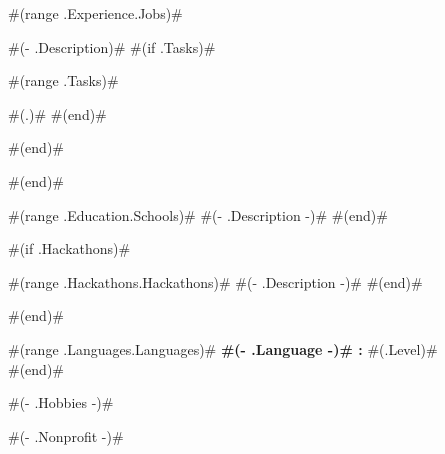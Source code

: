 \documentclass[8pt]{developercv} %
\begin{document}

\begin{entrylist}
	#(range .Experience.Jobs)#
	{ #(- .Description)# 
	#(if .Tasks)#\begin{compactitem}
		#(range .Tasks)# \item #(.)#
		#(end)#\end{compactitem}
	#(end)# }
#(end)#
\end{entrylist}


\begin{entrylist}
	#(range .Education.Schools)#
	{ #(- .Description -)# }
#(end)#
\end{entrylist}


#(if .Hackathons)#
\begin{entrylist}
	#(range .Hackathons.Hackathons)#
	{ #(- .Description -)# }
	#(end)#
\end{entrylist}
#(end)#



\begin{minipage}[t]{0.3\textwidth}
	\vspace{-\baselineskip} %

	#(range .Languages.Languages)#\textbf{ #(- .Language -)# :} #(.Level)# \\
	#(end)#
\end{minipage}
\hfill
\begin{minipage}[t]{0.3\textwidth}
	\vspace{-\baselineskip} %
	
	#(- .Hobbies -)#
\end{minipage}
\hfill
\begin{minipage}[t]{0.3\textwidth}
	\vspace{-\baselineskip} %
	
	#(- .Nonprofit -)#
	
\end{minipage}

\end{document}
